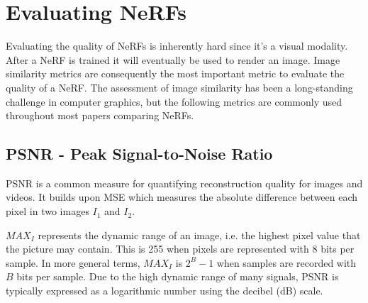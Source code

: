 

\begin{comment}
Exhaustive matching:
time complexity: O(n^2), where n is the number of images
memory complexity: O(n) for storing all images, O(n^2) for storing the results of the matching process

Sequential matching:
time complexity: O(n * k), where n is the number of images and k is the number of adjacent images each image is matched against
memory complexity: O(n * k)

Vocabulary tree-based matching:
time complexity: O(n^2), assuming that the size of the vocabulary tree is constant and not a function of the number n of images
memory complexity: O(n * k), where k is the number of top-retrieved images that each image is matched against
There is definitively literature on the topic of the time and memory complexity of vocabulary tree-based matching and image retrieval
\end{comment}




\section{Evaluating NeRFs} \label{sec:evaluating-nerfs}
Evaluating the quality of NeRFs is inherently hard since it's a visual modality. After a NeRF is trained it will eventually be used to render an image. Image similarity metrics are consequently the most important metric to evaluate the quality of a NeRF. The assessment of image similarity has been a long-standing challenge in computer graphics, but the following metrics are commonly used throughout most papers comparing NeRFs.

\subsection{PSNR - Peak Signal-to-Noise Ratio}
PSNR is a common measure for quantifying reconstruction quality for images and videos. It builds upon MSE which measures the absolute difference between each pixel in two images $I_1$ and $I_2$.



$MAX_I$ represents the dynamic range of an image, i.e. the highest pixel value that the picture may contain. This is 255 when pixels are represented with 8 bits per sample. In more general terms, $MAX_I$ is $2^B-1$ when samples are recorded with $B$ bits per sample. Due to the high dynamic range of many signals, PSNR is typically expressed as a logarithmic number using the decibel (dB) scale.

